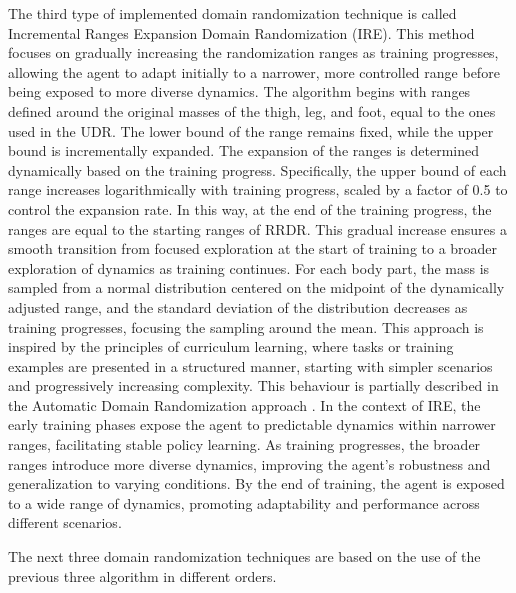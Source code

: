 \documentclass[12pt]{article}
\begin{document}
The third type of implemented domain randomization technique is called Incremental Ranges Expansion Domain Randomization (IRE). This method focuses on gradually increasing the randomization ranges as training progresses, allowing the agent to adapt initially to a narrower, more controlled range before being exposed to more diverse dynamics. The algorithm begins with ranges defined around the original masses of the thigh, leg, and foot, equal to the ones used in the UDR. The lower bound of the range remains fixed, while the upper bound is incrementally expanded. The expansion of the ranges is determined dynamically based on the training progress. Specifically, the upper bound of each range increases logarithmically with training progress, scaled by a factor of 0.5 to control the expansion rate. In this way, at the end of the training progress, the ranges are equal to the starting ranges of RRDR. This gradual increase ensures a smooth transition from focused exploration at the start of training to a broader exploration of dynamics as training continues. For each body part, the mass is sampled from a normal distribution centered on the midpoint of the dynamically adjusted range, and the standard deviation of the distribution decreases as training progresses, focusing the sampling around the mean. This approach is inspired by the principles of curriculum learning, where tasks or training examples are presented in a structured manner, starting with simpler scenarios and progressively increasing complexity. This behaviour is partially described in the Automatic Domain Randomization approach \cite{Akkaya2020}. In the context of IRE, the early training phases expose the agent to predictable dynamics within narrower ranges, facilitating stable policy learning. As training progresses, the broader ranges introduce more diverse dynamics, improving the agent's robustness and generalization to varying conditions. By the end of training, the agent is exposed to a wide range of dynamics, promoting adaptability and performance across different scenarios.

The next three domain randomization techniques are based on the use of the previous three algorithm in different orders.
\end{document}
